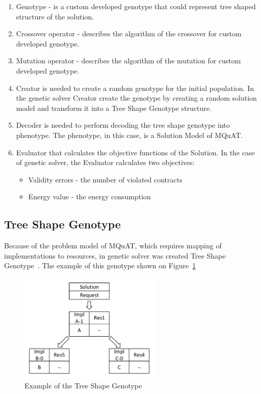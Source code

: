 \begin{enumerate}
	\item Genotype - is a custom developed genotype that could represent tree shaped structure of the solution.
	\item Crossover operator - describes the algorithm of the crossover for custom developed genotype.
	\item Mutation operator - describes the algorithm of the mutation for custom developed genotype.
	\item Creator is needed to create a random genotype for the initial population.
	In the genetic solver Creator create the genotype by creating a random solution model and transform it into a Tree Shape Genotype structure.
	\item Decoder is needed to perform decoding the tree shape genotype into phenotype. The phenotype, in this case, is a Solution Model of MQuAT.
	\item Evaluator that calculates the objective functions of the Solution. In the case of genetic solver, the Evaluator calculates two objectives: 
	
	\begin{itemize}
		\item Validity errors - the number of violated contracts
		\item Energy value - the energy consumption
	\end{itemize}
	
\end{enumerate}

\subsection{Tree Shape Genotype}

Because of the problem model of MQuAT, which requires mapping of implementations to resources, in genetic solver was created Tree Shape Genotype~\cite{ahmad18}.
The example of this genotype shown on Figure~\ref{fig:TreeShapeGenotypeExample}

\begin{figure}
	\centering
	\includegraphics[width=0.6\textwidth]{images/TreeShapeGenotypeExample.pdf}
	\caption[Example of the Tree Shape Genotype]{Example of the Tree Shape Genotype}
	\label{fig:TreeShapeGenotypeExample}
\end{figure}

